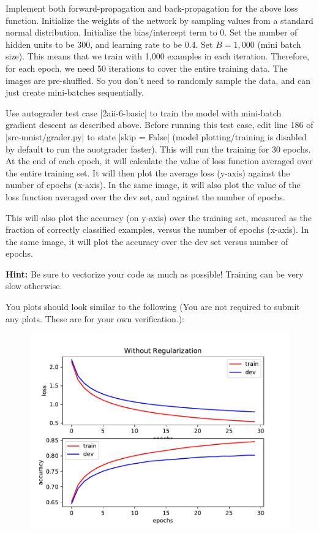 \item {} 

Implement both forward-propagation and back-propagation for the above loss function.
Initialize the weights of the network by sampling values from a standard normal
distribution. Initialize the bias/intercept term to 0.
Set the number of hidden units to be 300, and learning rate to be 0.4. Set $B = 1,000$
(mini batch size). This means that we train with 1,000 examples in each iteration.
Therefore, for each epoch, we need 50 iterations to cover the entire training data.
The images are pre-shuffled. So you don't need to randomly sample the data, and can
just create mini-batches sequentially.

Use autograder test case |2aii-6-basic| to train the model with mini-batch gradient descent
as described above. Before running this test case, edit line 186 of |src-mnist/grader.py| to state |skip = False| (model plotting/training is disabled by default to run the auotgrader faster). This will run the training for 30 epochs. At the end of each epoch, it will calculate
the value of loss function averaged over the entire training set.  It will then plot the average loss (y-axis) against the number of epochs (x-axis). In the same image, it will also plot the value of the loss function averaged over the dev set, and against the number of epochs.

This will also plot the accuracy (on y-axis) over the training set,
measured as the fraction of correctly classified examples, versus the number of epochs
(x-axis). In the same image, it will plot the accuracy over the dev set versus number of epochs.

\textbf{Hint:} Be sure to vectorize your code as much as possible! Training can be
very slow otherwise.

\clearpage\newpage

You plots should look similar to the following (You are not required to submit any plots.  These are for your own verification.):

\begin{figure}[H]
    \centering
    \includegraphics[scale=0.75]{02-mnist/baseline.pdf}
\end{figure}
